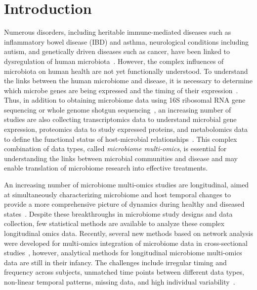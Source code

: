 \documentclass[aoas,preprint]{imsart}
\begin{document}
\section{Introduction}
Numerous disorders, including heritable immune-mediated diseases such as inflammatory bowel disease (IBD) and asthma, neurological conditions including autism, and genetically driven diseases such as cancer, have been linked to dysregulation of human microbiota~\citep{holleran2018fecal, lloyd2019multi, frati2019role, sharon2019human, ballen2016infection}. However, the complex influences of microbiota on human health are not yet functionally understood. To understand the links between the human microbiome and disease, it is necessary to determine which microbe genes are being expressed and the timing of their expression~\citep{sberro2019large}. Thus, in addition to obtaining microbiome data using 16S ribosomal RNA gene sequencing or whole genome shotgun sequencing~\citep{kuczynski2010direct, ranjan2016analysis, gill2006metagenomic}, an increasing number of studies are also collecting transcriptomics data to understand microbial gene expression, proteomics data to study expressed proteins, and metabolomics data to define the functional status of host-microbial relationships~\citep{integrative2014integrative, lloyd2019multi, bouslimani2019impact}. This complex combination of data types, called {\it microbiome multi-omics}, is essential for understanding the links between microbial communities and disease and may enable translation of microbiome research into effective treatments.

An increasing number of microbiome multi-omics studies are longitudinal, aimed at simultaneously characterizing microbiome and host temporal changes to provide a more comprehensive picture of dynamics during healthy and diseased states~\citep{integrative2014integrative, lloyd2019multi, vatanen2018human, stewart2018temporal}. Despite these breakthroughs in microbiome study designs and data collection, few statistical methods are available to analyze these complex longitudinal omics data. Recently, several new methods based on network analysis were developed for multi-omics integration of microbiome data in cross-sectional studies~\citep{jiang2019microbiome, morton2019learning}, however, analytical methods for longitudinal microbiome multi-omics data are still in their infancy. The challenges include irregular timing and frequency across subjects, unmatched time points between different data types, non-linear temporal patterns, missing data, and high individual variability~\citep{bodein2019generic}. 
\end{document}
